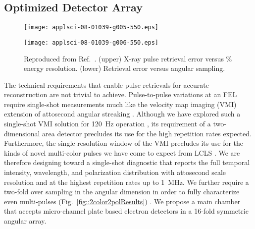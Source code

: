 \subsection*{Optimized Detector Array}
%

\begin{wrapfigure}[26]{r}{3in}
\vspace{-3\baselineskip}
\centerline{\texttt{[image: applsci-08-01039-g005-550.eps]}}
\centerline{\texttt{[image: applsci-08-01039-g006-550.eps]}}
\vspace{-1\baselineskip}
\caption{\label{fig::thomasfigs}Reproduced from Ref.~\cite{Feurer2018}. (upper) X-ray pulse retrieval error versus \% energy resolution.  
(lower) Retrieval error versus angular sampling.}
\end{wrapfigure}

The technical requirements that enable pulse retrievals for accurate reconstruction are not trivial to achieve.
Pulse-to-pulse variations at an FEL require single-shot measurements much like the velocity map imaging (VMI) \cite{VrakkingRSI} extension of attosecond angular streaking \cite{attoclockVMI2013}.
Although we have explored such a single-shot VMI solution for 120~Hz operation \cite{Siqi2018}, its requirement of a two-dimensional area detector precludes its use for the high repetition rates expected. 
Furthermore, the single resolution window of the VMI precludes its use for the kinds of novel multi-color pulses we have come to expect from LCLS \cite{Lutman13_twocolor,Marinelli13_twocolor,Marinelli2015,Lutman2016,LutmanFreshSlice2016}.
We are therefore designing toward a single-shot diagnostic that reports the full temporal intensity, wavelength, and polarization distribution with attosecond scale resolution and at the highest repetition rates up to 1~MHz.  
We further require a two-fold over sampling in the angular dimension in order to fully characterize even multi-pulses (Fig.~\ref{fig::2color2polResults}) \cite{Lutman2016,LutmanFreshSlice2016}.
We propose a main chamber that accepts micro-channel plate based electron detectors in a 16-fold symmetric angular array.

